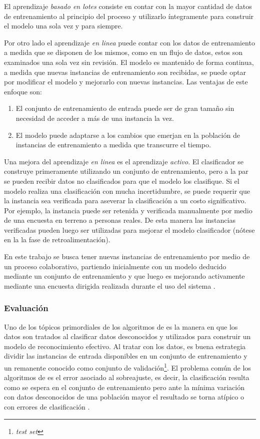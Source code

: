 El aprendizaje \emph{basado en lotes} consiste en contar con la mayor
cantidad de datos de entrenamiento al principio del proceso y utilizarlo
íntegramente para construir el modelo una sola vez y para siempre. 

Por otro lado el aprendizaje \emph{en linea} puede contar con los
datos de entrenamiento a medida que se disponen de los mismos, como
en un flujo de datos, estos son examinados una sola vez sin revisión.
El modelo es mantenido de forma continua, a medida que nuevas instancias
de entrenamiento son recibidas, se puede optar por modificar el modelo
y mejorarlo con nuevas instancias. Las ventajas de este enfoque son: 
\begin{enumerate}
\item El conjunto de entrenamiento de entrada puede ser de gran tamaño sin
necesidad de acceder a más de una instancia la vez. 
\item El modelo puede adaptarse a los cambios que emerjan en la población
de instancias de entrenamiento a medida que transcurre el tiempo.
\end{enumerate}
Una mejora del aprendizaje \emph{en linea} es el aprendizaje \emph{activo}.
El clasificador se construye primeramente utilizando un conjunto de
entrenamiento, pero a la par se pueden recibir datos no clasificados
para que el modelo los clasifique. Si el modelo realiza una clasificación
con mucha incertidumbre, se puede requerir que la instancia sea verificada
para aseverar la clasificación a un costo significativo. Por ejemplo,
la instancia puede ser retenida y verificada manualmente por medio
de una encuesta en terreno a personas reales. De esta manera las instancias
verificadas pueden luego ser utilizadas para mejorar el modelo clasificador
(nótese en la  la fase de retroalimentación). 

En este trabajo se busca tener nuevas instancias de entrenamiento
por medio de un proceso colaborativo, partiendo inicialmente con un
modelo deducido mediante un conjunto de entrenamiento y que luego
es mejorando activamente mediante una encuesta dirigida realizada
durante el uso del sistema .

\subsubsection{Evaluación}

Uno de los tópicos primordiales de los algoritmos de  es
la manera en que los datos son tratados al clasificar datos desconocidos
y utilizados para construir un modelo de reconocimiento efectivo.
Al tratar con los datos, es buena estrategia dividir las instancias
de entrada disponibles en un conjunto de entrenamiento y un remanente
conocido como conjunto de validación\emph{}\footnote{\emph{test set}}.
El problema común de los algoritmos de  es el error asociado
al sobreajuste, es decir, la clasificación resulta como se espera
en el conjunto de entrenamiento pero ante la mínima variación con
datos desconocidos de una población mayor el resultado se torna atípico
o con errores de clasificación \cite{Rajaraman2011}. 

